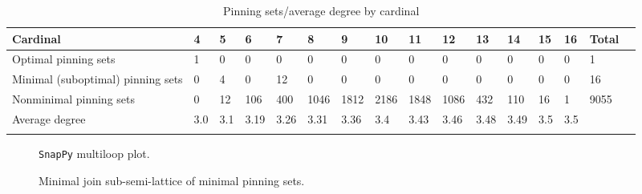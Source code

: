 \documentclass{article}%
\begin{document}
\begin{table}[ht]
	\caption{Pinning sets/average degree by cardinal}
	\centering
	\renewcommand{\arraystretch}{1.5}
	\begin{tabularx}{\textwidth}{lXXXXXXXXXXXXXXX}
		\toprule
			Cardinal & 4 & 5 & 6 & 7 & 8 & 9 & 10 & 11 & 12 & 13 & 14 & 15 & 16 & Total\\
			\hline
			Optimal pinning sets & 1 & 0 & 0 & 0 & 0 & 0 & 0 & 0 & 0 & 0 & 0 & 0 & 0 & 1 \\
			Minimal (suboptimal) pinning sets & 0 & 4 & 0 & 12 & 0 & 0 & 0 & 0 & 0 & 0 & 0 & 0 & 0 & 16 \\
			Nonminimal pinning sets & 0 & 12 & 106 & 400 & 1046 & 1812 & 2186 & 1848 & 1086 & 432 & 110 & 16 & 1 & 9055 \\
			Average degree & 3.0 & 3.1 & 3.19 & 3.26 & 3.31 & 3.36 & 3.4 & 3.43 & 3.46 & 3.48 & 3.49 & 3.5 & 3.5 &  \\
		\bottomrule \\ 
	\end{tabularx}
\end{table}

\begin{multicols}{2}
\begin{figure}[H]
\centering

\caption{\texttt{SnapPy} multiloop plot.}
\label{fig:tex/img/[[20, 24, 1, 21], [21, 11, 22, 12], [8, 19, 9, 20], [9, 23, 10, 24], [1, 10, 2, 11], [22, 2, 23, 3], [12, 18, 13, 17], [7, 16, 8, 17], [18, 3, 19, 4], [13, 25, 14, 28], [6, 27, 7, 28], [15, 26, 16, 27.svg}
\end{figure}
\columnbreak

\begin{figure}[H]
\centering
\scalebox{0.8}{}
\caption{Minimal join sub-semi-lattice of minimal pinning sets.}
\label{fig:tex/img/[[20, 24, 1, 21], [21, 11, 22, 12], [8, 19, 9, 20], [9, 23, 10, 24], [1, 10, 2, 11], [22, 2, 23, 3], [12, 18, 13, 17], [7, 16, 8, 17], [18, 3, 19, 4], [13, 25, 14, 28], [6, 27, 7, 28], [15, 26, 16, 27.pgf}
\end{figure}
\end{multicols}
\end{document}
